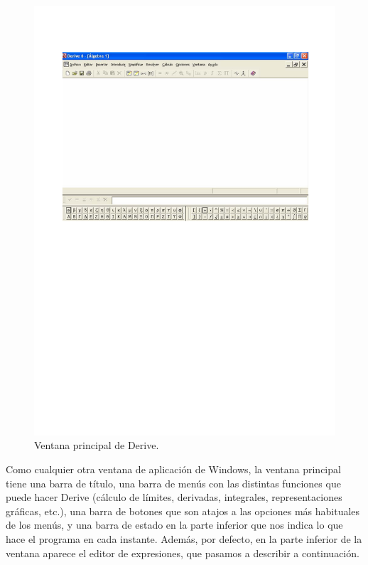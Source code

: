 \begin{figure}[h!]
\begin{center}
\includegraphics[scale=0.6]{img/introduccion_derive/principal}
\caption{Ventana principal de Derive.} \label{g:principal} 
\end{center}
\end{figure}


Como cualquier otra ventana de aplicación de Windows, la ventana
principal tiene una barra de título, una barra de menús con las
distintas funciones que puede hacer Derive (cálculo de límites,
derivadas, integrales, representaciones gráficas, etc.), una barra
de botones que son atajos a las opciones más habituales de los
menús, y una barra de estado en la parte inferior que nos indica lo
que hace el programa en cada instante. Además, por defecto, en la
parte inferior de la ventana aparece el editor de expresiones, que
pasamos a describir a continuación.

